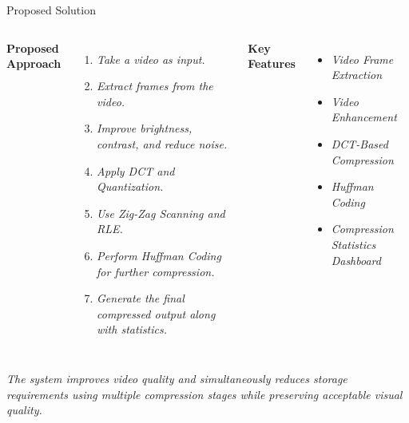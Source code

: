 \documentclass[aspectratio=169,11pt]{beamer}
\newcommand{\placeholder}[1]{\textit{\color{GEUGrey}#1}}
\begin{document}
\begin{frame}{Proposed Solution}
\begin{columns}[T,totalwidth=\textwidth]
{\small\textbf{\color{GEUBlue}Proposed Approach}}
\vspace{0.2mm}
\begin{enumerate}
\setlength{\itemsep}{0pt}
\small
\item \placeholder{Take a video as input.}
\item \placeholder{Extract frames from the video.}
\item \placeholder{Improve brightness, contrast, and reduce noise.}
\item \placeholder{Apply DCT and Quantization.}
\item \placeholder{Use Zig-Zag Scanning and RLE.}
\item \placeholder{Perform Huffman Coding for further compression.}
\item \placeholder{Generate the final compressed output along with statistics.}
\end{enumerate}
{\small\textbf{\color{GEUBlue}Key Features}}
\vspace{0.2mm}
\begin{itemize}
\setlength{\itemsep}{0pt}
\small
\item \placeholder{Video Frame Extraction}
\item \placeholder{Video Enhancement}
\item \placeholder{DCT-Based Compression}
\item \placeholder{Huffman Coding}
\item \placeholder{Compression Statistics Dashboard}
\end{itemize}
\end{columns}
\vspace{0.5mm}
\begin{center}
{\scriptsize\textit{\color{GEUGrey}
The system improves video quality and simultaneously reduces storage requirements using multiple compression stages while preserving acceptable visual quality.}}
\end{center}
\end{frame}
\end{document}

